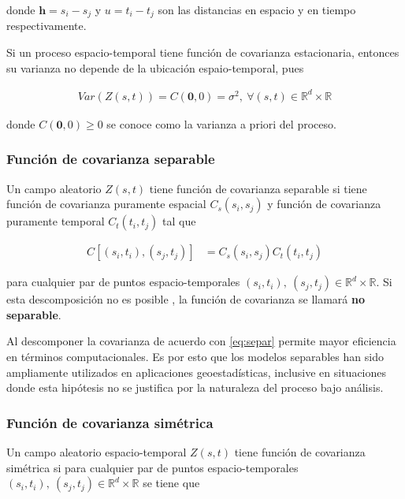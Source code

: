 \documentclass[
]{book}
\begin{document}
donde \(\textbf{h}=s_i-s_j\) y \(u=t_i-t_j\) son las distancias en espacio y en tiempo respectivamente.

Si un proceso espacio-temporal tiene función de covarianza estacionaria, entonces su varianza no depende de la ubicación espaio-temporal, pues

\begin{align}
Var(Z(s,t))=C(\boldsymbol 0,0)=\sigma^2,\ \forall (s,t) \in \mathbb{R}^d \times \mathbb{R}
\end{align}

donde \(C(\boldsymbol 0,0) \geq 0\) se conoce como la varianza a priori del proceso.

\hypertarget{funciuxf3n-de-covarianza-separable}{%
\subsubsection*{Función de covarianza separable}\label{funciuxf3n-de-covarianza-separable}}

Un campo aleatorio \(Z(s,t)\) tiene función de covarianza separable si tiene función de covarianza puramente espacial \(C_s(s_i,s_j)\) y función de covarianza puramente temporal \(C_t(t_i,t_j)\) tal que

\begin{align}
C[(s_i,t_i),(s_j,t_j)]&=C_s(s_i,s_j)C_t(t_i,t_j) 
\label{eq:separ}
\end{align}

para cualquier par de puntos espacio-temporales \((s_i,t_i),\ (s_j,t_j)\in \mathbb{R}^d\times \mathbb{R}\). Si esta descomposición no es posible , la función de covarianza se llamará \textbf{no separable}.

Al descomponer la covarianza de acuerdo con \eqref{eq:separ} permite mayor eficiencia en términos computacionales. Es por esto que los modelos separables han sido ampliamente utilizados en aplicaciones geoestadísticas, inclusive en situaciones donde esta hipótesis no se justifica por la naturaleza del proceso bajo análisis.

\hypertarget{funciuxf3n-de-covarianza-simuxe9trica}{%
\subsubsection*{Función de covarianza simétrica}\label{funciuxf3n-de-covarianza-simuxe9trica}}

Un campo aleatorio espacio-temporal \(Z(s,t)\) tiene función de covarianza simétrica si para cualquier par de puntos espacio-temporales \((s_i,t_i),\ (s_j,t_j)\in \mathbb{R}^d \times \mathbb{R}\) se tiene que
\end{document}
